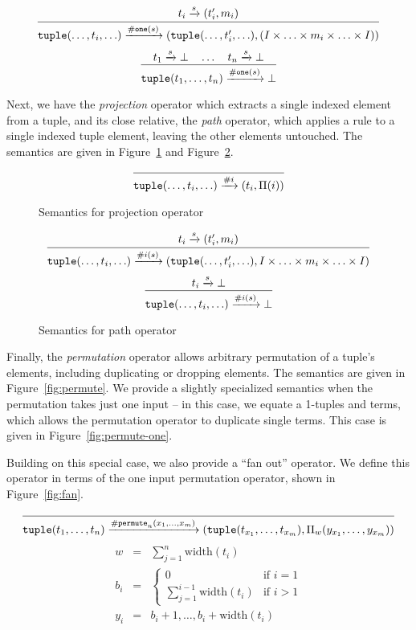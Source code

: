 \begin{figure*}[ht]
\[
\infer
  {\mathtt{tuple}(\ldots,t_i,\ldots) \arr{\mathtt{\#one}(s)} (\mathtt{tuple}(\ldots,t_i',\ldots),(I \times \ldots \times m_i \times \ldots \times I))}
  {t_i \arr{s} (t_i',m_i)}
\]
\[
\infer
  {\mathtt{tuple}(t_1,\ldots,t_n) \arr{\mathtt{\#one}(s)} \bot}
  {t_1 \arr{s} \bot \quad \ldots \quad t_n \arr{s} \bot}
\]
\caption{Semantics for branch-one operator}
\label{fig:branch}
\end{figure*}

Next, we have the \emph{projection} operator which extracts a single indexed element from a tuple, and its close relative, the \emph{path} operator, which applies a rule to a single indexed tuple element, leaving the other elements untouched. The semantics are given in Figure~\ref{fig:projection} and Figure~\ref{fig:path}.

\begin{figure}[ht]
\[
\infer
  {\mathtt{tuple}(\ldots,t_i,\ldots) \arr{\#i} (t_i,\Pi(i))}
  {}
\]
\caption{Semantics for projection operator}
\label{fig:projection}
\end{figure}

\begin{figure}[ht]
\[
\infer
  {\mathtt{tuple}(\ldots,t_i,\ldots) \arr{\#i(s)} (\mathtt{tuple}(\ldots,t_i',\ldots), I \times \ldots \times m_i \times \ldots \times I)}
  {t_i \arr{s} (t_i',m_i)}
\]
\[
\infer
  {\mathtt{tuple}(\ldots,t_i,\ldots) \arr{\#i(s)} \bot}
  {t_i \arr{s} \bot}
\]
\caption{Semantics for path operator}
\label{fig:path}
\end{figure}

Finally, the \emph{permutation} operator allows arbitrary permutation of a tuple's elements, including duplicating or dropping elements. The semantics are given in Figure~\ref{fig:permute}. We provide a slightly specialized semantics when the permutation takes just one input -- in this case, we equate a 1-tuples and terms, which allows the permutation operator to duplicate single terms. This case is given in Figure~\ref{fig:permute-one}.

Building on this special case, we also provide a ``fan out'' operator. We define this operator in terms of the one input permutation operator, shown in Figure~\ref{fig:fan}.

\begin{figure*}[htb]
\[
\infer
  {\mathtt{tuple}(t_1,\ldots,t_n) \arr{\mathtt{\#permute}_n(x_1,\ldots,x_m)} (\mathtt{tuple}(t_{x_1},\ldots,t_{x_m}),\Pi_w(y_{x_1},\ldots,y_{x_m}))}
  {}
\]
\begin{eqnarray*}
w   &=& \sum_{j=1}^n \mbox{width}(t_i)\\
b_i &=& \left\{
  \begin{array}{cl}
    0 & \mbox{if } i = 1\\
    \sum_{j=1}^{i-1} \mbox{width}(t_i) & \mbox{if } i > 1
  \end{array}
\right.\\
y_i &=& b_i+1,\ldots,b_i + \mbox{width}(t_i)
\end{eqnarray*}
\caption{Semantics for permutation operator}
\label{fig:permute}
\end{figure*}


